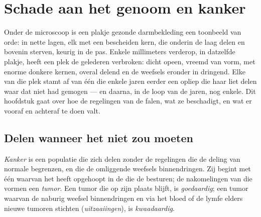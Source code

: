 \chapter{Schade aan het genoom en kanker}\label{ch:g11:cancer}

Onder de microscoop is een plakje gezonde darmbekleding een toonbeeld van
orde:  in nette lagen, elk met een bescheiden kern, die onderin de
laag delen en bovenin sterven, keurig in de pas. Enkele millimeters
verderop, in datzelfde plakje, heeft een plek  de gelederen
verbroken: dicht opeen, vreemd van vorm, met enorme donkere kernen, overal
delend en de weefsels eronder in dringend. Elke  van die plek stamt af
van één  die enkele jaren eerder een  opliep die haar liet delen
waar dat niet had gemogen --- en daarna, in de loop van de jaren, nog
enkele. Dit hoofdstuk gaat over hoe de regelingen van de  falen,
wat ze beschadigt, en wat er vooraf en achteraf te doen valt.

\section{Delen wanneer het niet zou moeten}

\begin{definition}[Kanker]\label{def:g11:cancer:cancer}
\emph{Kanker} is een populatie  die zich delen zonder
de regelingen die de deling van normale  begrenzen, en die de
omliggende weefsels binnendringen. Zij begint met één  waarvan het 
 heeft opgehoopt in de  die de  besturen; de
nakomelingen van die  vormen een \emph{tumor}. Een tumor
die op zijn plaats blijft, is \emph{goedaardig}; een tumor waarvan de
 naburig weefsel binnendringen en via het bloed of de lymfe elders
nieuwe tumoren stichten (\emph{uitzaaiingen}), is \emph{kwaadaardig}.
\end{definition}

